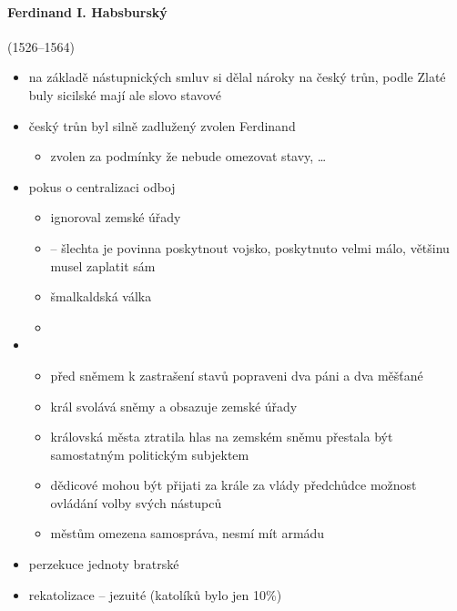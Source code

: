 \paragraph{Ferdinand I. Habsburský} (1526--1564)
\begin{itemize}
\item na základě nástupnických smluv si dělal nároky na český trůn, podle Zlaté buly sicilské mají ale slovo stavové
\item český trůn byl silně zadlužený \ra zvolen Ferdinand
	\begin{itemize}
	\item zvolen za podmínky že nebude omezovat stavy, \ldots
	\end{itemize}
\item pokus o centralizaci \ra odboj
	\begin{itemize}
	\item ignoroval zemské úřady
	\item {} -- šlechta je povinna poskytnout vojsko, poskytnuto velmi málo, většinu musel zaplatit sám
	\item šmalkaldská válka
	\item {}
	\end{itemize}
\item {}
	\begin{itemize}
	\item před sněmem k zastrašení stavů popraveni dva páni a dva měšťané
	\item král svolává sněmy a obsazuje zemské úřady
	\item královská města ztratila hlas na zemském sněmu \ra přestala být samostatným politickým subjektem
	\item dědicové mohou být přijati za krále za vlády předchůdce \ra možnost ovládání volby svých nástupců
	\item městům omezena samospráva, nesmí mít armádu
	\end{itemize}
\item perzekuce jednoty bratrské
\item rekatolizace -- jezuité (katolíků bylo jen 10\%)
\end{itemize}

